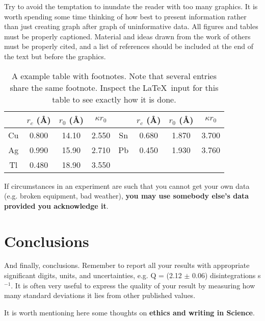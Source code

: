 Try to avoid the temptation to inundate the reader with too many
graphics.  It is worth spending some time thinking of how best to
present information rather than just creating graph after graph of
uninformative data.  All figures and tables must be properly
captioned.  Material and ideas drawn from the work of others must be
properly cited, and a list of references should be included at the end
of the text but before the graphics.

\begin{table}[h]
\caption{\label{tab:table1}A example table with footnotes.  Note that several entries share the same
footnote. Inspect the \LaTeX\ input for this table to see
exactly how it is done.}
\begin{ruledtabular}
\begin{tabular}{cccccccc}
 &$r_c$ (\AA)&$r_0$ (\AA)&$\kappa r_0$&
 &$r_c$ (\AA) &$r_0$ (\AA)&$\kappa r_0$\\
\hline
Cu& 0.800 & 14.10 & 2.550 &Sn\footnotemark[1] & 0.680 & 1.870 & 3.700 \\
Ag& 0.990 & 15.90 & 2.710 &Pb\footnotemark[1] & 0.450 & 1.930 & 3.760 \\
Tl& 0.480 & 18.90 & 3.550 & & & & \\
\end{tabular}
\end{ruledtabular}
\end{table}

If circumstances in an experiment are such that you cannot get your
own data (e.g. broken equipment, bad weather), {\bf you may use
somebody else's data provided you acknowledge it}.




\section{Conclusions}

And finally, conclusions.  Remember to report all your results with
appropriate significant digits, units, and uncertainties, e.g. Q =
(2.12 $\pm$ 0.06) disintegrations s$^{-1}$.  It is often very useful
to express the quality of your result by measuring how many standard
deviations it lies from other published values.

It is worth mentioning here some thoughts on {\bf ethics and writing
in Science}.

